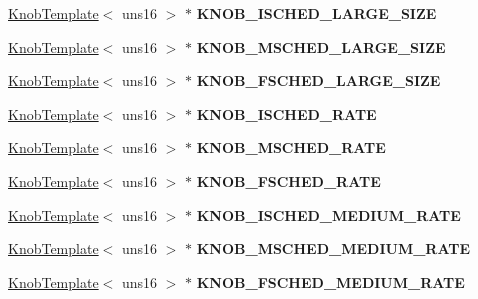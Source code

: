 \begin{DoxyCompactItemize}
\item 
\hypertarget{classall__knobs__c_ab4457e00691b9336da491e0b29ada4ad}{
\hyperlink{classKnobTemplate}{KnobTemplate}$<$ uns16 $>$ $\ast$ {\bfseries KNOB\_\-ISCHED\_\-LARGE\_\-SIZE}}
\label{classall__knobs__c_ab4457e00691b9336da491e0b29ada4ad}

\item 
\hypertarget{classall__knobs__c_a468b5bac0b0463a7348532489bd74aef}{
\hyperlink{classKnobTemplate}{KnobTemplate}$<$ uns16 $>$ $\ast$ {\bfseries KNOB\_\-MSCHED\_\-LARGE\_\-SIZE}}
\label{classall__knobs__c_a468b5bac0b0463a7348532489bd74aef}

\item 
\hypertarget{classall__knobs__c_ae14955c703ee0604979642b77b82eda8}{
\hyperlink{classKnobTemplate}{KnobTemplate}$<$ uns16 $>$ $\ast$ {\bfseries KNOB\_\-FSCHED\_\-LARGE\_\-SIZE}}
\label{classall__knobs__c_ae14955c703ee0604979642b77b82eda8}

\item 
\hypertarget{classall__knobs__c_aa2f498db2fb17d29f0b148320888158e}{
\hyperlink{classKnobTemplate}{KnobTemplate}$<$ uns16 $>$ $\ast$ {\bfseries KNOB\_\-ISCHED\_\-RATE}}
\label{classall__knobs__c_aa2f498db2fb17d29f0b148320888158e}

\item 
\hypertarget{classall__knobs__c_a30e1e7c2cbbaec8b6c5e238cc1484269}{
\hyperlink{classKnobTemplate}{KnobTemplate}$<$ uns16 $>$ $\ast$ {\bfseries KNOB\_\-MSCHED\_\-RATE}}
\label{classall__knobs__c_a30e1e7c2cbbaec8b6c5e238cc1484269}

\item 
\hypertarget{classall__knobs__c_a4bba722e7ba484341277c622d5909e75}{
\hyperlink{classKnobTemplate}{KnobTemplate}$<$ uns16 $>$ $\ast$ {\bfseries KNOB\_\-FSCHED\_\-RATE}}
\label{classall__knobs__c_a4bba722e7ba484341277c622d5909e75}

\item 
\hypertarget{classall__knobs__c_a79383110682d4359b7db6155f1f02b59}{
\hyperlink{classKnobTemplate}{KnobTemplate}$<$ uns16 $>$ $\ast$ {\bfseries KNOB\_\-ISCHED\_\-MEDIUM\_\-RATE}}
\label{classall__knobs__c_a79383110682d4359b7db6155f1f02b59}

\item 
\hypertarget{classall__knobs__c_ab9617d77133e4fcdca062935408e0680}{
\hyperlink{classKnobTemplate}{KnobTemplate}$<$ uns16 $>$ $\ast$ {\bfseries KNOB\_\-MSCHED\_\-MEDIUM\_\-RATE}}
\label{classall__knobs__c_ab9617d77133e4fcdca062935408e0680}

\item 
\hypertarget{classall__knobs__c_a0a725e6857d954ec8dddacf21382395e}{
\hyperlink{classKnobTemplate}{KnobTemplate}$<$ uns16 $>$ $\ast$ {\bfseries KNOB\_\-FSCHED\_\-MEDIUM\_\-RATE}}
\label{classall__knobs__c_a0a725e6857d954ec8dddacf21382395e}


\end{DoxyCompactItemize}

